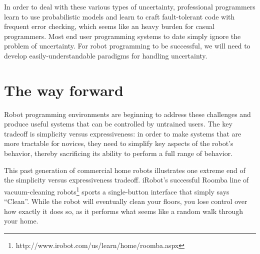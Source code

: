 \documentclass[11pt,twocolumn]{article}
\begin{document}
In order to deal with these various types of uncertainty, professional programmers learn to use probabilistic models and learn to craft fault-tolerant code with frequent error checking, which seems like an heavy burden for casual programmers. Most end user programming systems to date simply ignore the problem of uncertainty. For robot programming to be successful, we will need to develop easily-understandable paradigms for handling uncertainty.

\section{The way forward}

Robot programming environments are beginning to address these challenges and produce useful systems that can be controlled by untrained users. The key tradeoff is simplicity versus expressiveness: in order to make systems that are more tractable for novices, they need to simplify key aspects of the robot's behavior, thereby sacrificing its ability to perform a full range of behavior.

This past generation of commercial home robots illustrates one extreme end of the simplicity versus expressiveness tradeoff. iRobot's successful Roomba line of vacuum-cleaning robots\footnote{http://www.irobot.com/us/learn/home/roomba.aspx} sports a single-button interface that simply says ``Clean''. While the robot will eventually clean your floors, you lose control over how exactly it does so, as it performs what seems like a random walk through your home.


\end{document}
